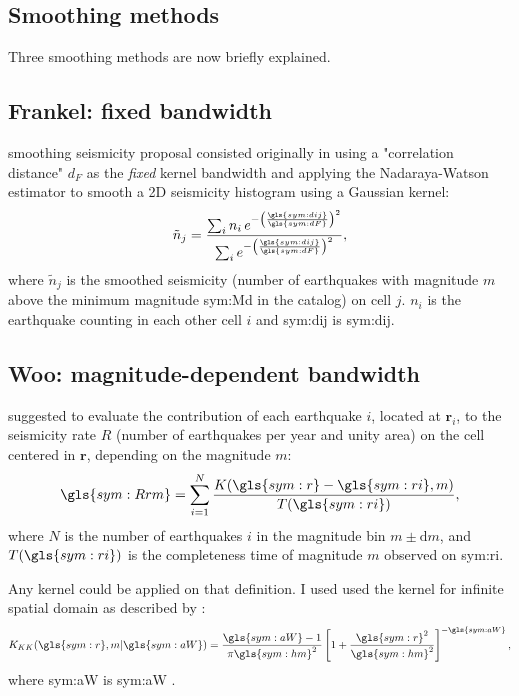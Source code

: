 \documentclass[draft, grl]{agutex}
\begin{document}
\begin{article}
%
%
\section{Smoothing methods}
Three smoothing methods are now briefly explained.

\subsection{Frankel: fixed bandwidth}

\citet{frankel_1995} smoothing seismicity proposal consisted originally in using a "correlation distance" $d_F$ as the \textit{fixed} kernel bandwidth and applying the Nadaraya-Watson \citep{nadaraya_1964, watson_1964} estimator to smooth a 2D seismicity histogram using a Gaussian kernel:
\begin{equation}
	\ensuremath{
		\tilde{n}_j = \frac{ \sum_{i} n_i \,e^{ - \left(\frac{\gls{sym:dij}}{\gls{sym:dF}}\right)^2}}
						   { \sum_{i}     e^{ - \left(\frac{\gls{sym:dij}}{\gls{sym:dF}}\right)^2}},
	}
	\label{eq:ni}
\end{equation}
where $\tilde{n}_j$ is the smoothed seismicity (number of earthquakes with magnitude $m$ above the minimum magnitude \gls{sym:Md} in the catalog) on cell $j$. $n_i$ is the earthquake counting in each other cell $i$ and \gls{sym:dij} is \glsdesc{sym:dij}.



\subsection{Woo: magnitude-dependent bandwidth}

\citet{woo_1996} suggested to evaluate the contribution of each earthquake $i$, located at $\boldsymbol{r}_i$, to the seismicity rate $R$ (number of earthquakes per year and unity area) on the cell centered in $\boldsymbol{r}$, depending on the magnitude $m$:
\begin{equation}
	\ensuremath{
		\gls{sym:Rrm} = \sum_{i=1}^{N} \frac{ K(\gls{sym:r} - \gls{sym:ri}, m)}
											{T({\gls{sym:ri})}},
	}
	\label{eq:Rrm}
\end{equation}
where $N$ is the number of earthquakes $i$ in the magnitude bin $m \pm \mathrm{d}m$,
and $T(\gls{sym:ri})$ is the completeness time of magnitude $m$ observed on \gls{sym:ri}.


Any kernel could be applied on that definition. I used used the \citet{kagan_knopoff_1980} kernel for infinite spatial domain as described by \citet{woo_1996}:
\begin{equation}
	\ensuremath{
		K_{KK}(\gls{sym:r}, m \arrowvert \gls{sym:aW}) =  \frac{  \gls{sym:aW}  -1}{\pi\gls{sym:hm}^2}
							\left[ 1 + \frac{\gls{sym:r}^2}{\gls{sym:hm}^2} \right]^{-\gls{sym:aW}},
	}
	\label{eq:k_kj}
\end{equation}
where \gls{sym:aW} is \glsdesc{sym:aW} \citep{verejones_1992}.



\end{article}
\end{document}
